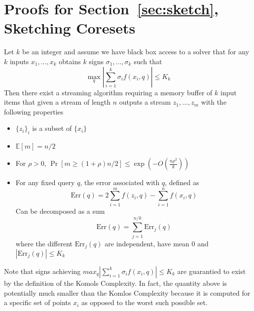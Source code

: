 \documentclass[anon,12pt]{colt2019} %
\newcommand{\E}{\mathbb{E}}
\renewcommand{\Pr}{\operatorname{Pr}}
\begin{document}



\appendix

\section{Proofs for Section~\ref{sec:sketch}, Sketching Coresets} 

\begin{lemma} \label{lem:compactor}
Let $k$ be an integer and assume we have black box access to a solver that for any $k$ inputs $x_1,\ldots,x_k$ obtains $k$ signs $\sigma_1,\ldots,\sigma_k$ such that
$$\max_q \left| \sum_{i=1}^{k} \sigma_i f(x_i, q)\right| \leq K_k$$
Then there exist a streaming algorithm requiring a memory buffer of $k$ input items that given a stream of length $n$ outputs a stream $z_1,\ldots,z_m$ with the following properties
\begin{itemize}
\item $\{z_i\}_i$ is a subset of $\{x_i\}$
\item $\E[m] = n/2$
\item For $\rho >0$, $\Pr[m \geq (1+\rho)n/2] \leq \exp \left( -O\left(\frac{n\rho^2}{k}\right)\right)$
\item For any fixed query $q$, the error associated with $q$, defined as
$$\text{Err}(q) = 2\sum_{i=1}^m f(z_i,q) - \sum_{i=1}^n f(x_i,q)  $$
Can be decomposed as a sum
$$\text{Err}(q) = \sum_{j=1}^{n/k} \text{Err}_j(q)$$
where the different $\text{Err}_j(q)$ are independent, have mean 0 and $|\text{Err}_j(q)| \leq K_k$
\end{itemize}
\end{lemma}

Note that signs achieving $max_q \left| \sum_{i=1}^{k} \sigma_i f(x_i, q)\right| \leq K_k$ are guarantied to exist by the definition of the Komols Complexity. In fact, the quantity above is potentially much smaller than the Komlos Complexity because it is computed for a specific set of points $x_i$ as opposed to the worst such possible set. 
\end{document}
